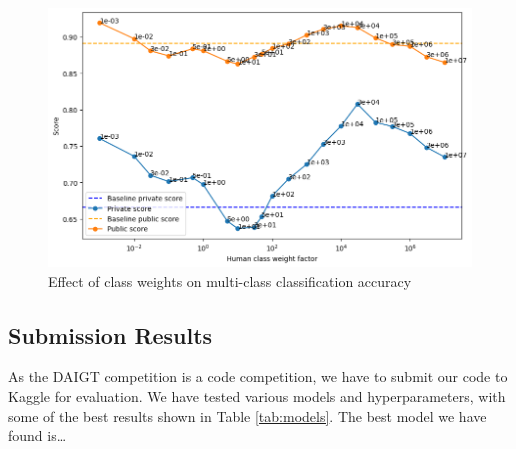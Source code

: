 \documentclass[conference]{IEEEtran}
\begin{document}
\begin{figure}[htbp]
  \centerline{\includegraphics[width=\columnwidth]{figs/multiclass.png}}
  \caption{Effect of class weights on multi-class classification accuracy}
  \label{fig:multiclass}
\end{figure}

\subsection{Submission Results}

As the DAIGT competition is a code competition, we have to submit our code to Kaggle for evaluation. We have tested various models and hyperparameters, with some of the best results shown in Table \ref{tab:models}. The best model we have found is\dots
\end{document}
